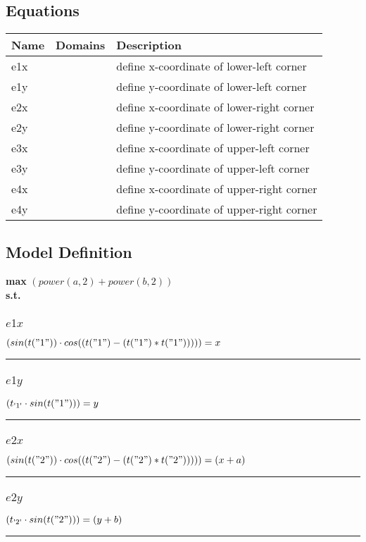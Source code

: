 \documentclass[11pt]{article}
\begin{document}
\subsection*{Equations}
\begin{tabularx}{\textwidth}{| l | l | X |}
\hline
\textbf{Name} & \textbf{Domains} & \textbf{Description}\\
\hline
\endhead

e1x &  & define x-coordinate of lower-left corner\\
e1y &  & define y-coordinate of lower-left corner\\
e2x &  & define x-coordinate of lower-right corner\\
e2y &  & define y-coordinate of lower-right corner\\
e3x &  & define x-coordinate of upper-left corner\\
e3y &  & define y-coordinate of upper-left corner\\
e4x &  & define x-coordinate of upper-right corner\\
e4y &  & define y-coordinate of upper-right corner\\
\hline
\end{tabularx}
\subsection*{Model Definition}
\textbf{max} $(power(a,2) + power(b,2))$\\
\textbf{s.t.}
\subsubsection*{$e1x$}
$
(sin(t("1")) \cdot cos((t("1") - (t("1") * t("1"))))) = x
$
\vspace{5pt}
\hrule
\subsubsection*{$e1y$}
$
(t_\text{\text{\textquotesingle 1\textquotesingle}} \cdot sin(t("1"))) = y
$
\vspace{5pt}
\hrule
\subsubsection*{$e2x$}
$
(sin(t("2")) \cdot cos((t("2") - (t("2") * t("2"))))) = (x + a)
$
\vspace{5pt}
\hrule
\subsubsection*{$e2y$}
$
(t_\text{\text{\textquotesingle 2\textquotesingle}} \cdot sin(t("2"))) = (y + b)
$
\vspace{5pt}
\hrule
\end{document}
